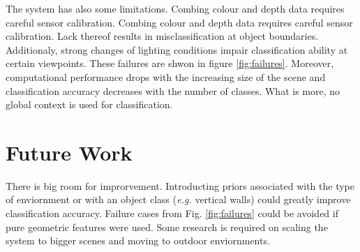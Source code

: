 \documentclass{llncs}
\begin{document}
  The system has also some limitations. Combing colour and depth data requires careful sensor calibration. Combing colour and depth data requires careful sensor calibration. Lack thereof results in misclassification at object boundaries. Additionaly, strong changes of lighting conditions impair classification ability at certain viewpoints. These failures are shwon in figure \ref{fig:failures}. Moreover, computational performance drops with the increasing size of the scene and classification accuracy decreases with the number of classes. What is more, no global context is used for classification. 

\section{Future Work}
  
  There is big room for improrvement. Introducting priors associated with the type of enviornment or with an object class (\emph{e.g.} vertical walls) could greatly improve classification accuracy. Failure cases from Fig. \ref{fig:failures} could be avoided if pure geometric features were used. Some research is required on scaling the system to bigger scenes and moving to outdoor enviornments. 
\end{document}
